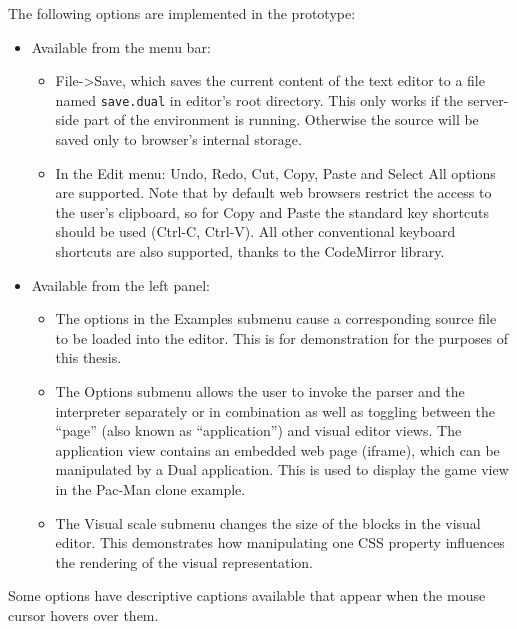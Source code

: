 The following options are implemented in the prototype:
\begin{itemize}
    \item Available from the menu bar:
    \begin{itemize}
        \item File->Save, which saves the current content of the text editor to
          a file named \texttt{save.dual} in editor's root directory. This only
          works if the server-side part of the environment is running. Otherwise
          the source will be saved only to browser's internal storage.
        \item In the Edit menu: Undo, Redo, Cut, Copy, Paste and Select All
          options are supported. Note that by default web browsers restrict the
          access to the user's clipboard, so for Copy and Paste the standard key
          shortcuts should be used (Ctrl-C, Ctrl-V). All other conventional
          keyboard shortcuts are also supported, thanks to the CodeMirror
          library.
    \end{itemize}
    \item Available from the left panel:
    \begin{itemize}
        \item The options in the Examples submenu cause a corresponding source
          file to be loaded into the editor. This is for demonstration for the
          purposes of this thesis.
        \item The Options submenu allows the user to invoke the parser and the
          interpreter separately or in combination as well as toggling between
          the ``page'' (also known as ``application'') and visual editor
          views. The application view contains an embedded web page (iframe),
          which can be manipulated by a Dual application. This is used to
          display the game view in the Pac-Man clone example.
        \item The Visual scale submenu changes the size of the blocks in the
          visual editor. This demonstrates how manipulating one CSS property
          influences the rendering of the visual representation.
    \end{itemize}
\end{itemize}

Some options have descriptive captions available that appear when the mouse
cursor hovers over them.

